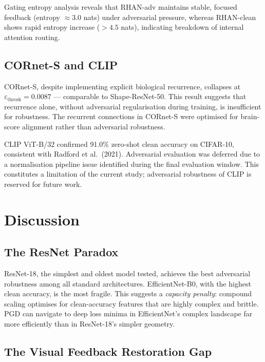 \documentclass[12pt,a4paper]{article}
\begin{document}
Gating entropy analysis reveals that RHAN-adv maintains stable, focused
feedback (entropy $\approx 3.0$ nats) under adversarial pressure, whereas
RHAN-clean shows rapid entropy increase ($>4.5$ nats), indicating breakdown
of internal attention routing.

\subsection{CORnet-S and CLIP}

CORnet-S, despite implementing explicit biological recurrence, collapses at
$\varepsilon_{\text{thresh}}{=}0.0087$ --- comparable to Shape-ResNet-50.
This result suggests that recurrence alone, without adversarial regularisation
during training, is insufficient for robustness.
The recurrent connections in CORnet-S were optimised for brain-score
alignment rather than adversarial robustness.

CLIP ViT-B/32 confirmed 91.0\% zero-shot clean accuracy on CIFAR-10,
consistent with Radford et al.\ (2021).
Adversarial evaluation was deferred due to a normalisation pipeline issue
identified during the final evaluation window. This constitutes a
limitation of the current study; adversarial robustness of CLIP is
reserved for future work.

\section{Discussion}
\label{sec:discussion}

\subsection{The ResNet Paradox}

ResNet-18, the simplest and oldest model tested, achieves the best
adversarial robustness among all standard architectures.
EfficientNet-B0, with the highest clean accuracy, is the most fragile.
This suggests a \emph{capacity penalty}: compound scaling optimises for
clean-accuracy features that are highly complex and brittle.
PGD can navigate to deep loss minima in EfficientNet's complex landscape
far more efficiently than in ResNet-18's simpler geometry.

\subsection{The Visual Feedback Restoration Gap}
\end{document}

